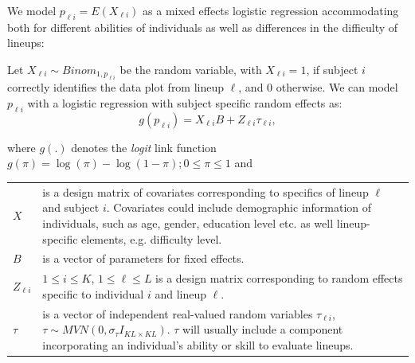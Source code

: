 \documentclass{article}
\newcommand{\red}[1]{{\color{red} #1}}
\newcommand{\hh}[1]{{\color{orange} #1}} %
\begin{document}
\hh{
We model $p_{\ell i} = E(X_{\ell i})$ as  a mixed effects logistic regression
 accommodating both for different abilities of individuals as well as differences in the difficulty of lineups: 


Let $X_{\ell i} \sim Binom_{1, p_{\ell i}}$ be the random variable, with $X_{ \ell i}= 1$, if  subject $i$ correctly identifies the data plot from lineup $\ell$, and 0 otherwise.
We can model $p_{ \ell i}$ with a logistic regression with subject specific random effects as:
\begin{equation} \label{mixed}
g( p_{\ell i} )= X_{\ell i} B +  Z_{\ell i}  \tau_{\ell i},  
\end{equation}

where $g(.)$ denotes the {\it logit} link function $g(\pi)=\log(\pi) - \log(1-\pi); 0 \le \pi \le 1$ and

\begin{tabular}{lp{5.5in}}
$X$  & is a design matrix of covariates corresponding to specifics of lineup $\ell$ and subject $i$. Covariates could include  demographic information of individuals, such as age, gender, education level etc. as well lineup-specific elements, e.g. difficulty level. \\
$B$ & is a vector of parameters for fixed effects.\\
$Z_{\ell i}$ & $1 \le i \le K$, $1 \le \ell \le L$  is a design matrix corresponding to random effects specific to individual $i$ and lineup $\ell$.  \\
$\tau$ & is a vector of independent real-valued random variables $\tau_{\ell i}$,  $\tau  \sim  MVN(0,\sigma_\tau I_{KL \times KL})$. $\tau$ will usually include a component incorporating an individual's ability or skill to evaluate lineups.\\
\end{tabular}

}



\end{document}
